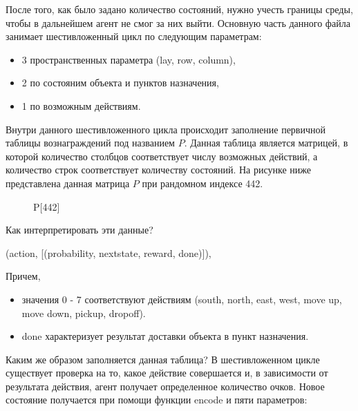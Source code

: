 \documentclass[a4paper]{report}
\theoremstyle{definition}
\theoremstyle{plain}
\theoremstyle{remark}
\theoremstyle{remark}
\theoremstyle{definition}
\begin{document}
После того, как было задано количество состояний, нужно учесть границы среды, чтобы в дальнейшем агент не смог за них выйти. Основную часть данного файла занимает шестивложенный цикл по следующим параметрам:
\begin{itemize}
    \item 3 пространственных параметра (lay, row, column),
    \item 2 по состояним объекта и пунктов назначения,
    \item 1 по возможным действиям. 
\end{itemize}
Внутри данного шестивложенного цикла происходит заполнение первичной таблицы вознаграждений под названием $P$. Данная таблица является матрицей, в которой количество столбцов соответствует числу возможных действий, а количество строк соответствует количеству состояний. На рисунке ниже представлена данная матрица $P$ при рандомном индексе 442.
\begin{figure}[H]
	\caption{P[442]}
\end{figure}
Как интерпретировать эти данные?
\begin{center}
    (action, [(probability, nextstate, reward, done)]),
\end{center}
Причем, 
\begin{itemize}
    \item значения 0 - 7 соответствуют действиям (south, north, east, west, move up, move down, pickup, dropoff).
    \item done характеризует результат доставки объекта в пункт назначения.
\end{itemize}
Каким же образом заполняется данная таблица? В шестивложенном цикле существует проверка на то, какое действие совершается и, в зависимости от результата действия, агент получает определенное количество очков. Новое состояние получается при помощи функции encode и пяти параметров:
\end{document}
